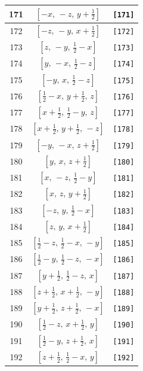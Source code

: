 \documentclass[fleqn,8pt]{jsarticle}
\begin{document}
\begin{longtable}{ccc}
171 & $\left[ - x,\, - z,\, y + \frac{1}{2} \right]$ & {\tt [171]} \\ \hline
172 & $\left[ - z,\, - y,\, x + \frac{1}{2} \right]$ & {\tt [172]} \\ \hline
173 & $\left[ z,\, - y,\, \frac{1}{2} - x \right]$ & {\tt [173]} \\ \hline
174 & $\left[ y,\, - x,\, \frac{1}{2} - z \right]$ & {\tt [174]} \\ \hline
175 & $\left[ - y,\, x,\, \frac{1}{2} - z \right]$ & {\tt [175]} \\ \hline
176 & $\left[ \frac{1}{2} - x,\, y + \frac{1}{2},\, z \right]$ & {\tt [176]} \\ \hline
177 & $\left[ x + \frac{1}{2},\, \frac{1}{2} - y,\, z \right]$ & {\tt [177]} \\ \hline
178 & $\left[ x + \frac{1}{2},\, y + \frac{1}{2},\, - z \right]$ & {\tt [178]} \\ \hline
179 & $\left[ - y,\, - x,\, z + \frac{1}{2} \right]$ & {\tt [179]} \\ \hline
180 & $\left[ y,\, x,\, z + \frac{1}{2} \right]$ & {\tt [180]} \\ \hline
181 & $\left[ x,\, - z,\, \frac{1}{2} - y \right]$ & {\tt [181]} \\ \hline
182 & $\left[ x,\, z,\, y + \frac{1}{2} \right]$ & {\tt [182]} \\ \hline
183 & $\left[ - z,\, y,\, \frac{1}{2} - x \right]$ & {\tt [183]} \\ \hline
184 & $\left[ z,\, y,\, x + \frac{1}{2} \right]$ & {\tt [184]} \\ \hline
185 & $\left[ \frac{1}{2} - z,\, \frac{1}{2} - x,\, - y \right]$ & {\tt [185]} \\ \hline
186 & $\left[ \frac{1}{2} - y,\, \frac{1}{2} - z,\, - x \right]$ & {\tt [186]} \\ \hline
187 & $\left[ y + \frac{1}{2},\, \frac{1}{2} - z,\, x \right]$ & {\tt [187]} \\ \hline
188 & $\left[ z + \frac{1}{2},\, x + \frac{1}{2},\, - y \right]$ & {\tt [188]} \\ \hline
189 & $\left[ y + \frac{1}{2},\, z + \frac{1}{2},\, - x \right]$ & {\tt [189]} \\ \hline
190 & $\left[ \frac{1}{2} - z,\, x + \frac{1}{2},\, y \right]$ & {\tt [190]} \\ \hline
191 & $\left[ \frac{1}{2} - y,\, z + \frac{1}{2},\, x \right]$ & {\tt [191]} \\ \hline
192 & $\left[ z + \frac{1}{2},\, \frac{1}{2} - x,\, y \right]$ & {\tt [192]} \\
\end{longtable}
\end{document}
